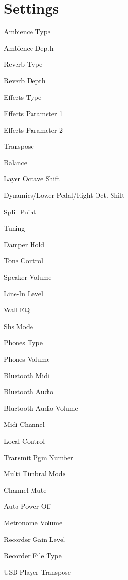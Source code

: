\section{Settings}

Ambience Type


Ambience Depth

Reverb Type


Reverb Depth

Effects Type

Effects Parameter 1


Effects Parameter 2

Transpose


Balance

Layer Octave Shift

Dynamics/Lower Pedal/Right Oct. Shift


Split Point




Tuning

Damper Hold

Tone Control


Speaker Volume

Line-In Level


Wall EQ

Shs Mode

Phones Type


Phones Volume

Bluetooth Midi


Bluetooth Audio

Bluetooth Audio Volume

Midi Channel


Local Control

Transmit Pgm Number


Multi Timbral Mode

Channel Mute

Auto Power Off


Metronome Volume

Recorder Gain Level


Recorder File Type

USB Player Transpose
